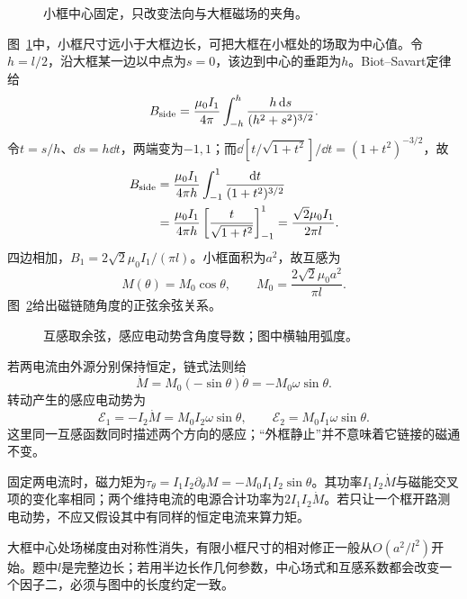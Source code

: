 \begin{figure}[H]\centering
{}
\caption{小框中心固定，只改变法向与大框磁场的夹角。}\label{fig:i2-e7-q}
\end{figure}
\begin{solution}
图~\ref{fig:i2-e7-q}中，小框尺寸远小于大框边长，可把大框在小框处的场取为中心值。令$h=l/2$，沿大框某一边以中点为$s=0$，该边到中心的垂距为$h$。Biot--Savart定律给
\[B_{\rm side}=\frac{\mu_0I_1}{4\pi}
\int_{-h}^{h}\frac{h\mathop{}\!\mathrm d s}{(h^2+s^2)^{3/2}}.
\]
令$t=s/h$、$\dd s=h\dd t$，两端变为$-1,1$；而$\dd[t/\sqrt{1+t^2}]/\dd t=(1+t^2)^{-3/2}$，故
\[\begin{aligned}
B_{\rm side}&=\frac{\mu_0I_1}{4\pi h}
\int_{-1}^{1}\frac{\mathop{}\!\mathrm d t}{(1+t^2)^{3/2}}\\
&=\frac{\mu_0I_1}{4\pi h}
\left[\frac{t}{\sqrt{1+t^2}}\right]_{-1}^{1}
=\frac{\sqrt2\mu_0I_1}{2\pi l}.
\end{aligned}\]
四边相加，$B_1=2\sqrt2\mu_0I_1/(\pi l)$。小框面积为$a^2$，故互感为
\[\boxed{M(\theta)=M_0\cos\theta,\qquad
M_0=\frac{2\sqrt2\mu_0a^2}{\pi l}}.
\]
图~\ref{fig:i2-e7-s}给出磁链随角度的正弦余弦关系。
\begin{figure}[H]\centering
{}
\caption{互感取余弦，感应电动势含角度导数；图中横轴用弧度。}\label{fig:i2-e7-s}
\end{figure}

若两电流由外源分别保持恒定，链式法则给
\[\dot M=M_0(-\sin\theta)\dot\theta=-M_0\omega\sin\theta.\]
转动产生的感应电动势为
\[\boxed{\mathcal E_1=-I_2\dot M=M_0I_2\omega\sin\theta,\qquad
\mathcal E_2=M_0I_1\omega\sin\theta}.
\]
这里同一互感函数同时描述两个方向的感应；“外框静止”并不意味着它链接的磁通不变。

固定两电流时，磁力矩为$\tau_\theta=I_1I_2\partial_\theta M=-M_0I_1I_2\sin\theta$。其功率$I_1I_2\dot M$与磁能交叉项的变化率相同；两个维持电流的电源合计功率为$2I_1I_2\dot M$。若只让一个框开路测电动势，不应又假设其中有同样的恒定电流来算力矩。

大框中心处场梯度由对称性消失，有限小框尺寸的相对修正一般从$O(a^2/l^2)$开始。题中$l$是完整边长；若用半边长作几何参数，中心场式和互感系数都会改变一个因子二，必须与图中的长度约定一致。
\end{solution}

